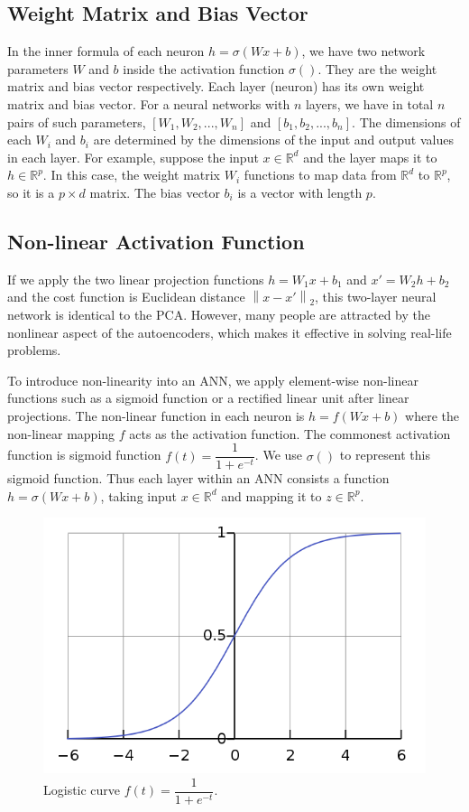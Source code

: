 \documentclass[12pt]{report} %
\newcommand{\norm}[1]{\left\lVert #1 \right\rVert}
\begin{document}
\subsection{Weight Matrix and Bias Vector}
In the inner formula of each neuron $h=\sigma(Wx+b)$, we have two network parameters $W$ and $b$ inside the activation function $\sigma()$. They are the weight matrix and bias vector respectively. Each layer (neuron) has its own weight matrix and bias vector. For a neural networks with $n$ layers, we have in total $n$ pairs of such parameters, $[W_1, W_2,...,W_n]$ and $[b_1,b_2,...,b_n]$. The dimensions of each $W_i$ and $b_i$ are determined by the dimensions of the input and output values in each layer. For example, suppose the input \(x\in \mathbb{R}^{d}\) and the layer maps it to \(h\in \mathbb{R}^{p}\). In this case, the weight matrix $W_i$ functions to map data from $\mathbb{R}^{d}$ to $\mathbb{R}^{p}$, so it is a $p \times d$ matrix. The bias vector $b_i$ is a vector with length $p$.

\subsection{Non-linear Activation Function}
If we apply the two linear projection functions $h=W_1x+b_1$ and $x'=W_2h+b_2$ and the cost function is Euclidean distance $\norm{x-x'}_2$, this two-layer neural network is identical to the PCA. However, many people are attracted by the nonlinear aspect of the autoencoders, which makes it effective in solving real-life problems.

To introduce non-linearity into an ANN, we apply element-wise non-linear functions such as a sigmoid function or a rectified linear unit after linear projections. The non-linear function in each neuron is $h= f(Wx + b)$ where the non-linear mapping $f$ acts as the activation function. The commonest activation function is sigmoid function $f(t)=\dfrac{1}{1+e^{-t}}$. We use $\sigma()$ to represent this sigmoid function. Thus each layer within an ANN consists a function \(h=\sigma(Wx+b)\), taking input \(x\in \mathbb{R}^{d}\) and mapping it to \(z\in \mathbb{R}^{p}\).
\begin{figure}[H]
	\centering
	\includegraphics[scale=0.4]{pictures/sigmoid.png}
	\caption{Logistic curve $f(t)=\dfrac{1}{1+e^{-t}}$\cite{SIGPIC}.}
	\label{fig:2}
\end{figure}
\end{document}
